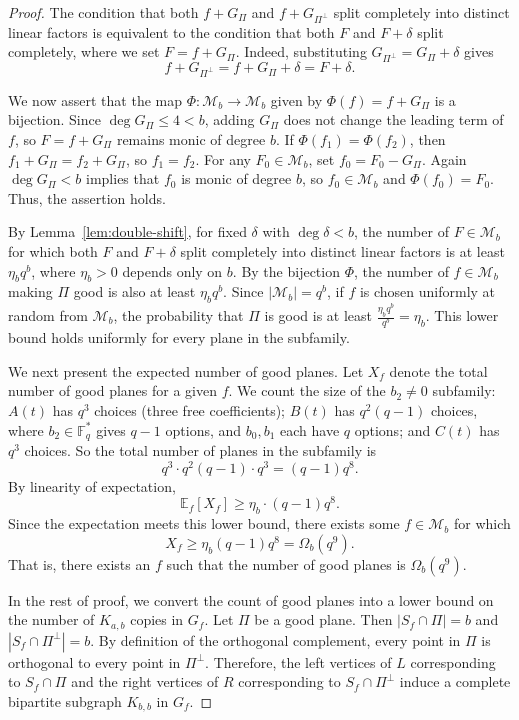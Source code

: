 \documentclass[10pt,a4paper]{amsart}
\begin{document}
\begin{proof}
The condition that both $f + G_\Pi$ and $f + G_{\Pi^\perp}$ split completely into distinct linear factors is equivalent to the condition that both $F$ and $F+\delta$ split completely, where we set $F = f + G_\Pi$. Indeed, substituting $G_{\Pi^\perp} = G_\Pi + \delta$ gives
\[
f + G_{\Pi^\perp} = f + G_\Pi + \delta = F + \delta.
\]

We now assert that the map $\Phi: \mathcal{M}_b \to \mathcal{M}_b$ given by $\Phi(f) = f + G_\Pi$ is a bijection.
Since $\deg G_\Pi \leq 4 < b$, adding $G_\Pi$ does not change the leading term of $f$, so $F = f+G_\Pi$ remains monic of degree $b$.
If $\Phi(f_1) = \Phi(f_2)$, then $f_1 + G_\Pi = f_2 + G_\Pi$, so $f_1 = f_2$.
For any $F_0 \in \mathcal{M}_b$, set $f_0 = F_0 - G_\Pi$. 
Again $\deg G_\Pi < b$ implies that $f_0$ is monic of degree $b$, so $f_0 \in \mathcal{M}_b$ and $\Phi(f_0) = F_0$. 
Thus, the assertion holds.

By Lemma~\ref{lem:double-shift}, for fixed $\delta$ with $\deg \delta < b$, the number of $F \in \mathcal{M}_b$ for which both $F$ and $F+\delta$ split completely into distinct linear factors is at least $\eta_b q^b$, where $\eta_b > 0$ depends only on $b$. By the bijection $\Phi$, the number of $f \in \mathcal{M}_b$ making $\Pi$ good is also at least $\eta_b q^b$.
Since $|\mathcal{M}_b| = q^b$, if $f$ is chosen uniformly at random from $\mathcal{M}_b$, the probability that $\Pi$ is good is at least
$\frac{\eta_b q^b}{q^b} = \eta_b.$
This lower bound holds uniformly for every plane in the subfamily.

We next present the expected number of good planes.
Let $X_f$ denote the total number of good planes for a given $f$. 
We count the size of the $b_2 \neq 0$ subfamily:
$A(t)$ has $q^3$ choices (three free coefficients);
$B(t)$ has $q^2(q-1)$ choices, where $b_2 \in \mathbb{F}_q^*$ gives $q-1$ options,
and $b_0,b_1$ each have $q$ options;
and $C(t)$ has $q^3$ choices.
So the total number of planes in the subfamily is
\[
q^3 \cdot q^2(q-1) \cdot q^3 = (q-1) q^8.
\]
By linearity of expectation,
\[
\mathbb{E}_f [X_f] \geq \eta_b \cdot (q-1) q^8.
\]
Since the expectation meets this lower bound, there exists some $f \in \mathcal{M}_b$ for which
\[
X_f \geq \eta_b (q-1) q^8 = \Omega_b(q^9).
\]
That is, there exists an $f$ such that the number of good planes is $\Omega_b(q^9)$.



In the rest of proof, we  convert the count of good planes into a lower bound on the number of $K_{a,b}$ copies in $G_f$.
Let $\Pi$ be a good plane. Then $|S_f \cap \Pi| = b$ and $|S_f \cap \Pi^\perp| = b$. By definition of the orthogonal complement, every point in $\Pi$ is orthogonal to every point in $\Pi^\perp$. Therefore, the left vertices of $L$ corresponding to $S_f \cap \Pi$ and the right vertices of $R$ corresponding to $S_f \cap \Pi^\perp$ induce a complete bipartite subgraph $K_{b,b}$ in $G_f$.


\end{proof}
\end{document}
